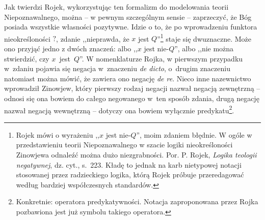 Jak twierdzi Rojek, wykorzystując ten formalizm do modelowania teorii
Niepoznawalnego, można -- w pewnym szczególnym sensie -- zaprzeczyć, że
Bóg posiada wszystkie własności pozytywne.
Idzie o to, że po
wprowadzeniu funktora nieokreśloności $?$, zdanie
,,nieprawda, że $x$ jest
$Q$''\footnote{Rojek mówi o wyrażeniu ,,$x$ jest nie-$Q$'', moim zdaniem
błędnie. W ogóle w przedstawieniu teorii Niepoznawalnego w szacie logiki nieokreśloności Zinowjewa odnaleźć można dużo niezgrabności. Por. P. Rojek, \textit{Logika teologii negatywnej}, dz. cyt., s.~223. Kładę to jednak na karb nietypowej notacji stosowanej przez radzieckiego logika, którą Rojek próbuje przeredagować według bardziej współczesnych standardów.} staje się dwuznaczne. Może ono przyjąć jedno
z dwóch znaczeń: albo ,,$x$ jest nie-$Q$'', albo ,,nie można stwierdzić, czy $x$~jest~$Q$''. W nomenklaturze Rojka, w pierwszym przypadku w~zdaniu pojawia
się negacja w~znaczeniu \textit{de dicto}, o~drugim znaczeniu natomiast
można mówić, że zawiera ono negację \textit{de re}. Nieco inne
nazewnictwo wprowadził Zinowjew, który pierwszy rodzaj negacji nazwał
negacją zewnętrzną -- odnosi się ona bowiem do całego negowanego w~ten
sposób zdania, drugą negację nazwał
negacją wewnętrzną -- dotyczy ona bowiem wyłącznie predykatu\footnote{Konkretnie: operatora predykatywności.
Notacja zaproponowana przez Rojka pozbawiona jest już symbolu takiego operatora.}.

